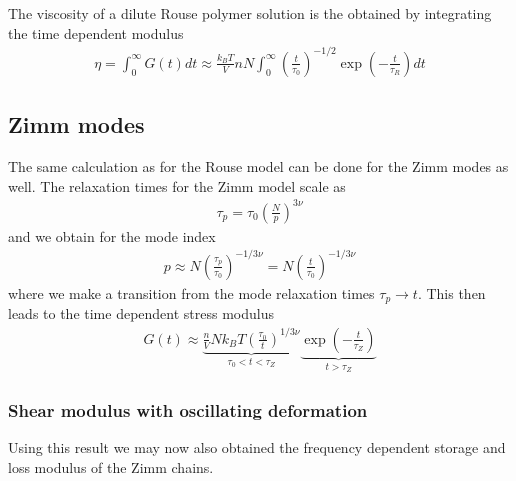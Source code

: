 \documentclass[letterpaper,10pt,english]{sphinxmanual}
\begin{document}
\noindent{}

\sphinxAtStartPar
The viscosity of a dilute Rouse polymer solution is the obtained by integrating the time dependent modulus
\begin{equation*}
\begin{split}\eta=\int_0^{\infty}G(t)dt \approx \frac{k_B T}{V}nN \int_{0}^{\infty} \left ( \frac{t}{\tau_0}\right )^{-1/2}\exp\left (-\frac{t}{\tau_R} \right )dt\end{split}
\end{equation*}
\sphinxAtStartPar
{}


\subsection{Zimm modes}
\label{\detokenize{notebooks/L25/1_polymer_dynamics:Zimm-modes}}
\sphinxAtStartPar
The same calculation as for the Rouse model can be done for the Zimm modes as well. The relaxation times for the Zimm model scale as
\begin{equation*}
\begin{split}\tau_p=\tau_0\left (\frac{N}{p} \right )^{3\nu}\end{split}
\end{equation*}
\sphinxAtStartPar
and we obtain for the mode index
\begin{equation*}
\begin{split}p\approx N \left ( \frac{\tau_p}{\tau_0}\right)^{-1/3\nu}=N\left ( \frac{t}{\tau_0}\right )^{-1/3\nu}\end{split}
\end{equation*}
\sphinxAtStartPar
where we make a transition from the mode relaxation times \(\tau_p\rightarrow t\). This then leads to the time dependent stress modulus
\begin{equation*}
\begin{split}G(t)\approx \underbrace{\frac{n}{V}Nk_B T \left ( \frac{\tau_0}{t} \right)^{1/3\nu}}_{\tau_0<t<\tau_Z}\underbrace{\exp\left (-\frac{t}{\tau_Z} \right )}_{t>\tau_Z}\end{split}
\end{equation*}
\noindent{}


\subsubsection{Shear modulus with oscillating deformation}
\label{\detokenize{notebooks/L25/1_polymer_dynamics:id1}}
\sphinxAtStartPar
Using this result we may now also obtained the frequency dependent storage and loss modulus of the Zimm chains.
\end{document}

